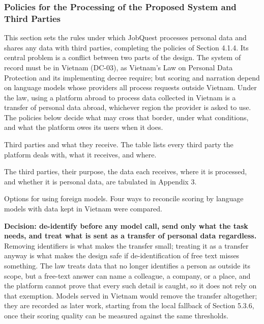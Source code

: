 \subsubsection{Policies for the Processing of the Proposed System and Third Parties}

This section sets the rules under which JobQuest processes personal data and shares any data with third parties, completing the policies of Section 4.1.4. Its central problem is a conflict between two parts of the design. The system of record must be in Vietnam (DC-03), as Vietnam's Law on Personal Data Protection and its implementing decree require\cite{r99,r100}; but scoring and narration depend on language models whose providers all process requests outside Vietnam. Under the law, using a platform abroad to process data collected in Vietnam is a transfer of personal data abroad, whichever region the provider is asked to use. The policies below decide what may cross that border, under what conditions, and what the platform owes its users when it does.

Third parties and what they receive. The table lists every third party the platform deals with, what it receives, and where.

The third parties, their purpose, the data each receives, where it is processed, and whether it is personal data, are tabulated in Appendix 3.

Options for using foreign models. Four ways to reconcile scoring by language models with data kept in Vietnam were compared.

\textbf{Decision: de-identify before any model call, send only what the task needs, and treat what is sent as a transfer of personal data regardless.\allowbreak{}} Removing identifiers is what makes the transfer small; treating it as a transfer anyway is what makes the design safe if de-\allowbreak{}identification of free text misses something. The law treats data that no longer identifies a person as outside its scope, but a free-text answer can name a colleague, a company, or a place, and the platform cannot prove that every such detail is caught, so it does not rely on that exemption. Models served in Vietnam would remove the transfer altogether; they are recorded as later work, starting from the local fallback of Section 5.3.6, once their scoring quality can be measured against the same thresholds.

